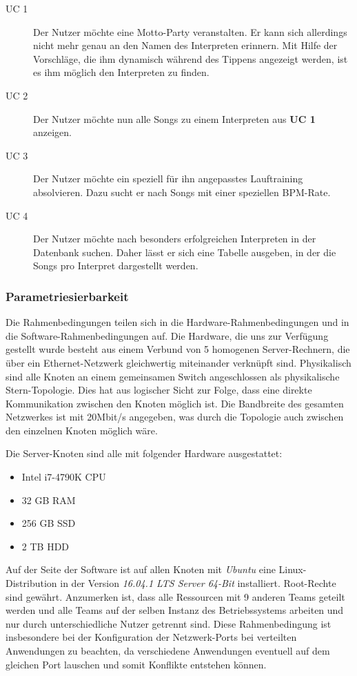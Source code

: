 \begin{description}
	\item[UC 1] Der Nutzer möchte eine Motto-Party veranstalten. Er kann sich allerdings nicht mehr genau an den Namen des Interpreten erinnern. Mit Hilfe der Vorschläge, die ihm dynamisch während des Tippens angezeigt werden, ist es ihm möglich den Interpreten zu finden.
	\item[UC 2] Der Nutzer möchte nun alle Songs zu einem Interpreten aus \textbf{UC 1} anzeigen.
	\item[UC 3] Der Nutzer möchte ein speziell für ihn angepasstes Lauftraining absolvieren. Dazu sucht er nach Songs mit einer speziellen \ac{BPM}-Rate.
	\item[UC 4] Der Nutzer möchte nach besonders erfolgreichen Interpreten in der Datenbank suchen. Daher lässt er sich eine Tabelle ausgeben, in der die Songs pro Interpret dargestellt werden.

\end{description}

\subsubsection{Parametriesierbarkeit}
\label{anforderungen:rahmenbedingungen}
Die Rahmenbedingungen teilen sich in die Hardware-Rahmenbedingungen und in die Software-Rahmenbedingungen auf.
Die Hardware, die uns zur Verfügung gestellt wurde besteht aus einem Verbund von 5 homogenen Server-Rechnern, 
die über ein Ethernet-Netzwerk gleichwertig miteinander verknüpft sind. Physikalisch sind alle Knoten an einem gemeinsamen
Switch angeschlossen als physikalische Stern-Topologie. Dies hat aus logischer Sicht zur Folge, dass eine direkte Kommunikation
zwischen den Knoten möglich ist. Die Bandbreite des gesamten Netzwerkes ist mit 20Mbit/s angegeben, was durch die Topologie
auch zwischen den einzelnen Knoten möglich wäre.

Die Server-Knoten sind alle mit folgender Hardware ausgestattet:
\begin{itemize}
	\item Intel i7-4790K CPU
	\item 32 GB RAM
	\item 256 GB SSD
	\item 2 TB HDD
\end{itemize}

Auf der Seite der Software ist auf allen Knoten mit \textit{Ubuntu} eine Linux-Distribution in der Version 
\textit{16.04.1 LTS Server 64-Bit} installiert. Root-Rechte sind gewährt.
Anzumerken ist, dass alle Ressourcen mit 9 anderen Teams geteilt werden und alle Teams auf der selben 
Instanz des Betriebssystems arbeiten und nur durch unterschiedliche Nutzer getrennt sind. 
Diese Rahmenbedingung ist insbesondere bei der Konfiguration der Netzwerk-Ports bei verteilten Anwendungen 
zu beachten, da verschiedene Anwendungen eventuell auf dem gleichen Port lauschen und somit 
Konflikte entstehen können.

